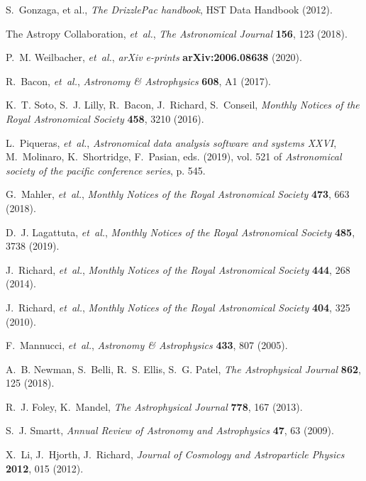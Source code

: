 \documentclass[12pt]{article}
\begin{document}
\begin{thebibliography}{10}
S.~Gonzaga, {et al.}, {\it The {DrizzlePac} handbook\/}, HST Data Handbook (2012).

{The Astropy Collaboration}, {\it et~al.\/}, {\it The Astronomical Journal\/}
  {\bf 156}, 123 (2018).

P.~M. Weilbacher, {\it et~al.\/}, {\it arXiv e-prints\/} {\bf arXiv:2006.08638}
  (2020).

R.~Bacon, {\it et~al.\/}, {\it Astronomy \& Astrophysics\/} {\bf 608}, A1
  (2017).

K.~T. Soto, S.~J. Lilly, R.~Bacon, J.~Richard, S.~Conseil, {\it Monthly Notices
  of the Royal Astronomical Society\/} {\bf 458}, 3210 (2016).

L.~Piqueras, {\it et~al.\/}, {\it Astronomical data analysis software and
  systems {XXVI}\/}, M.~Molinaro, K.~Shortridge, F.~Pasian, eds. (2019), vol.
  521 of {\it Astronomical society of the pacific conference series\/}, p. 545.

G.~Mahler, {\it et~al.\/}, {\it Monthly Notices of the Royal Astronomical
  Society\/} {\bf 473}, 663 (2018).

D.~J. Lagattuta, {\it et~al.\/}, {\it Monthly Notices of the Royal Astronomical
  Society\/} {\bf 485}, 3738 (2019).

J.~Richard, {\it et~al.\/}, {\it Monthly Notices of the Royal Astronomical
  Society\/} {\bf 444}, 268 (2014).

J.~Richard, {\it et~al.\/}, {\it Monthly Notices of the Royal Astronomical
  Society\/} {\bf 404}, 325 (2010).

F.~Mannucci, {\it et~al.\/}, {\it Astronomy \& Astrophysics\/} {\bf 433}, 807
  (2005).

A.~B. Newman, S.~Belli, R.~S. Ellis, S.~G. Patel, {\it The Astrophysical
  Journal\/} {\bf 862}, 125 (2018).

R.~J. Foley, K.~Mandel, {\it The Astrophysical Journal\/} {\bf 778}, 167
  (2013).

S.~J. Smartt, {\it Annual Review of Astronomy and Astrophysics\/} {\bf 47}, 63
  (2009).

X.~Li, J.~Hjorth, J.~Richard, {\it Journal of Cosmology and Astroparticle
  Physics\/} {\bf 2012}, 015 (2012).


\end{thebibliography}
\end{document}
